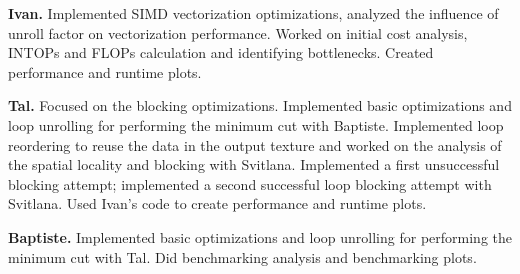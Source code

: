 \documentclass[letterpaper]{article}
\newcommand{\mypar}[1]{{\bf #1.}}
\begin{document}
\mypar{Ivan} Implemented SIMD vectorization optimizations, analyzed the influence of unroll factor on vectorization performance. Worked on initial cost analysis, INTOPs and FLOPs calculation and identifying bottlenecks. Created performance and runtime plots. 

\mypar{Tal} Focused on the blocking optimizations. Implemented basic optimizations and loop unrolling for performing the minimum cut with Baptiste. Implemented loop reordering to reuse the data in the output texture and worked on the analysis of the spatial locality and blocking with Svitlana. Implemented a first unsuccessful blocking attempt; implemented a second successful loop blocking attempt with Svitlana. Used Ivan's code to create performance and runtime plots.

\mypar{Baptiste} Implemented basic optimizations and loop unrolling for performing the minimum cut with Tal. Did benchmarking analysis and benchmarking plots.



\end{document}
